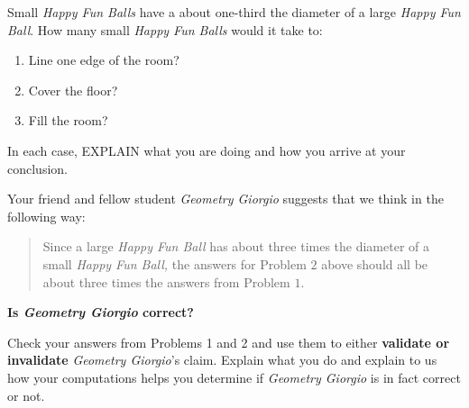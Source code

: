 \documentclass[handout,noauthor,nooutcomes,hints,12pt]{ximera}
\begin{document}
\begin{question}
  Small \textit{Happy Fun Balls} have a about one-third the diameter of a large
  \textit{Happy Fun Ball}. How many small \textit{Happy Fun Balls} would it take
  to:
  \begin{enumerate}
    \item Line one edge of the room?
    \item Cover the floor?
    \item Fill the room?
  \end{enumerate}
  In each case,  EXPLAIN what you are doing and how you arrive at your
  conclusion.
\end{question}
\mynewpage

\begin{question}
  Your friend and fellow student \textit{Geometry Giorgio} suggests
  that we think in the following way:
  \begin{quote}
    Since a large \textit{Happy Fun Ball} has about three times the
    diameter of a small \textit{Happy Fun Ball,} the answers for Problem
    $2$ above should all be about three times the answers from Problem
    $1$.
  \end{quote}
\begin{center}
  \bf Is \textit{Geometry Giorgio} correct?
\end{center}
Check your answers from Problems 1 and 2 and use them to either \textbf{validate or invalidate}
\textit{Geometry Giorgio}'s claim. Explain what you do and explain to us how your computations helps you determine if 
\textit{Geometry Giorgio} is in fact correct or not.
\end{question}
\end{document}

